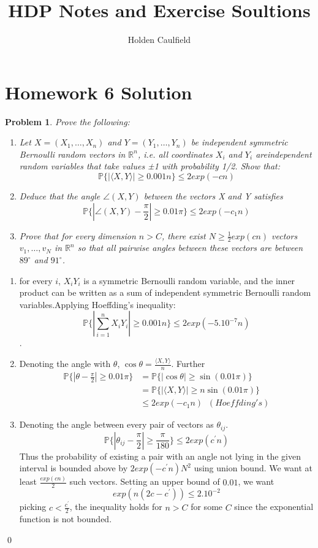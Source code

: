 \documentclass[12pt]{article}
\title{HDP Notes and Exercise Soultions}
\author{Holden Caulfield}
\newtheorem{ex}{Problem}
\begin{document}
\centering	\section*{Homework 6 Solution}

\begin{bx}
	
	\begin{ex}
	Prove the following:
	\begin{enumerate}[label=(\alph*)]
		\item Let $X=(X_1,\dots,X_n)$ and $Y=(Y_1,\dots,Y_n)$ be independent symmetric Bernoulli random vectors in $\mathbb{R}^n$, i.e. all coordinates $X_i$ and $Y_i$ areindependent random
		variables that take values ±1 with probability 1/2. Show that:
		\[
		\mathbb{P}\{\left | \langle X,Y\rangle \right | \ge 0.001n\} \le 2exp(-cn)
		\]
	\item Deduce that the angle $\angle(X,Y)$ between the vectors X and Y satisfies
		\[
	\mathbb{P}\{\left | \angle (X,Y) - \frac{\pi}{2} \right | \ge 0.01\pi\} \le 2exp(-c_1n)
	\]
	\item Prove that for every dimension $n > C$, there exist $N\ge \frac{1}{2} exp(cn)$ vectors $v_1,\dots,v_N$
	in $\mathbb{R}^n$ so that all pairwise angles between these vectors are between $89^\circ$ and $91^\circ$.
		\end{enumerate}
	\end{ex}
	\tcblower
\begin{enumerate}[label=(\alph*)]
	\item for every $i$, $X_iY_i$ is a symmetric Bernoulli random variable, and the inner product can be written as a sum of independent symmetric Bernoulli random variables.Applying Hoeffding's inequality:
	$$	\mathbb{P}\{\left |\sum_{i=1}^{n}X_iY_i \right | \ge 0.001n\} \le 2exp(-5.10^{-7}n)$$.
	\item Denoting the angle with $\theta$, $\cos\theta
	 =\frac{\langle X,Y \rangle}{n}$.
	 Further
	 \begin{align*}
	 	\mathbb{P}\{\left | \theta - \frac{\pi}{2} \right | \ge 0.01\pi\}&=\mathbb{P}\{\left |\cos\theta\right | \ge \sin(0.01\pi)\} \\
	 	&= \mathbb{P}\{\left |\langle X,Y\rangle \right | \ge n\sin(0.01\pi)\} \\
	 	&\le 2exp(-c_1n) \; \; (Hoeffding's)
	 \end{align*}
 \item Denoting the angle between every pair of vectors as $\theta_{ij}$.
 \[
 \mathbb{P}\{\left | \theta_{ij} - \frac{\pi}{2} \right |\ge \frac{\pi}{180}\} \le 2exp(c^{\prime}n)
 \]
 Thus the probability of existing a pair with an angle not lying in the given interval is bounded above by $2exp(-c^{\prime}n)N^2$ using union bound.
 We want at least $\frac{exp(cn)}{2}$ such vectors.
 Setting an upper bound of $0.01$, we want
 \[
 exp(n(2c-c^{\prime})) \le 2.10^{-2}
 \]
 picking $c < \frac{c^\prime}{2}$, the inequality holds for $n>C$ for some $C$ since the exponential function is not bounded.
\end{enumerate}
\qed
\end{bx}
\end{document}
